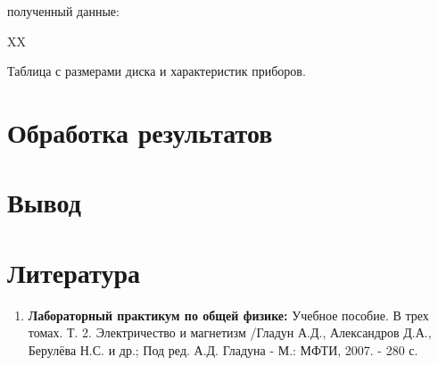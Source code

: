 \documentclass[a4paper, 12pt]{article}%
\begin{document}
полученный данные: 

XX

Таблица с размерами диска и характеристик приборов.


\section{Обработка результатов}



\section{Вывод}



\section{Литература}

\begin{enumerate}
\item \textbf{Лабораторный практикум по общей физике:} Учебное пособие. В трех томах. Т. 2. Электричество и магнетизм /Гладун А.Д., Александров Д.А., Берулёва Н.С. и др.; Под ред. А.Д. Гладуна - М.: МФТИ, 2007. - 280 с.

\end{enumerate}		
		
\end{document}

